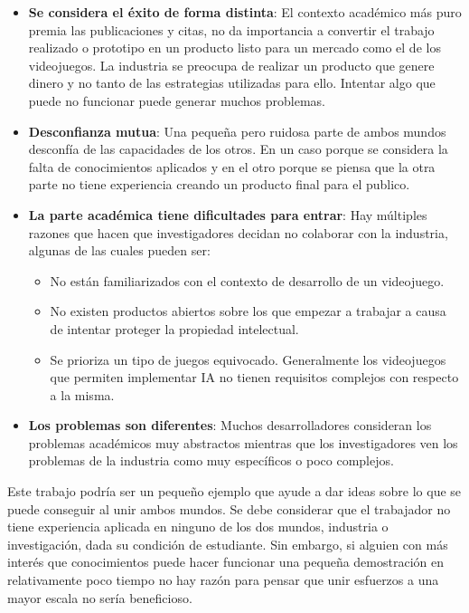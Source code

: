 \begin{itemize}
	\item \textbf{Se considera el éxito de forma distinta}: El contexto académico más puro premia las publicaciones y citas, no da importancia a convertir el trabajo realizado o prototipo en un producto listo para un mercado como el de los videojuegos. La industria se preocupa de realizar un producto que genere dinero y no tanto de las estrategias utilizadas para ello. Intentar algo que puede no funcionar puede generar muchos problemas.
	\item \textbf{Desconfianza mutua}: Una pequeña pero ruidosa parte de ambos mundos desconfía de las capacidades de los otros. En un caso porque se considera la falta de conocimientos aplicados y en el otro porque se piensa que la otra parte no tiene experiencia creando un producto final para el publico.
	\item \textbf{La parte académica tiene dificultades para entrar}: Hay múltiples razones que hacen que investigadores decidan no colaborar con la industria, algunas de las cuales pueden ser:
		\begin{itemize}
			\item No están familiarizados con el contexto de desarrollo de un videojuego.
			\item No existen productos abiertos sobre los que empezar a trabajar a causa de intentar proteger la propiedad intelectual.
			\item Se prioriza un tipo de juegos equivocado. Generalmente los videojuegos que permiten implementar IA no tienen requisitos complejos con respecto a la misma.
		\end{itemize}
	\item \textbf{Los problemas son diferentes}: Muchos desarrolladores consideran los problemas académicos muy abstractos mientras que los investigadores ven los problemas de la industria como muy específicos o poco complejos.
\end{itemize}

\bigskip

Este trabajo podría ser un pequeño ejemplo que ayude a dar ideas sobre lo que se puede conseguir al unir ambos mundos. Se debe considerar que el trabajador no tiene experiencia aplicada en ninguno de los dos mundos, industria o investigación, dada su condición de estudiante. Sin embargo, si alguien con más interés que conocimientos puede hacer funcionar una pequeña demostración en relativamente poco tiempo no hay razón para pensar que unir esfuerzos a una mayor escala no sería beneficioso.

